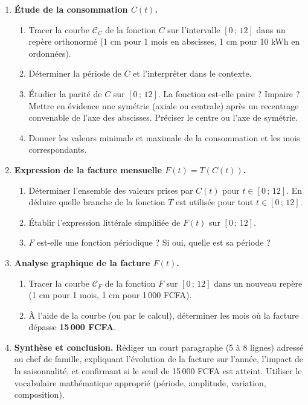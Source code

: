 \documentclass[11pt]{article}
\newcommand{\cle}[1]{{\popxbold\color{popdark}#1}}
\begin{document}
\begin{enumerate}
    \item \textbf{Étude de la consommation $C(t)$.}
    \begin{enumerate}
        \item Tracer la courbe $\mathcal{C}_C$ de la fonction $C$ sur l'intervalle $[0\,;\,12]$ dans un repère orthonormé (1 cm pour 1 mois en abscisses, 1 cm pour 10 kWh en ordonnées).
        \item Déterminer la \cle{période} de $C$ et l'interpréter dans le contexte.
        \item Étudier la \cle{parité} de $C$ sur $[0\,;\,12]$. La fonction est-elle paire ? Impaire ? Mettre en évidence une symétrie (axiale ou centrale) après un recentrage convenable de l'axe des abscisses. Préciser le centre ou l'axe de symétrie.
        \item Donner les valeurs minimale et maximale de la consommation et les mois correspondants.
    \end{enumerate}

    \item \textbf{Expression de la facture mensuelle $F(t) = T(C(t))$.}
    \begin{enumerate}
        \item Déterminer l'ensemble des valeurs prises par $C(t)$ pour $t \in [0\,;\,12]$. En déduire quelle branche de la fonction $T$ est utilisée pour tout $t \in [0\,;\,12]$.
        \item Établir l'expression littérale simplifiée de $F(t)$ sur $[0\,;\,12]$.
        \item $F$ est-elle une fonction périodique ? Si oui, quelle est sa période ?
    \end{enumerate}

    \item \textbf{Analyse graphique de la facture $F(t)$.}
    \begin{enumerate}
        \item Tracer la courbe $\mathcal{C}_F$ de la fonction $F$ sur $[0\,;\,12]$ dans un nouveau repère (1 cm pour 1 mois, 1 cm pour 1\,000 FCFA).
        \item À l'aide de la courbe (ou par le calcul), déterminer les mois où la facture dépasse \textbf{15\,000 FCFA}.
    \end{enumerate}

    \item \textbf{Synthèse et conclusion.}
    Rédiger un court paragraphe (5 à 8 lignes) adressé au chef de famille, expliquant l'évolution de la facture sur l'année, l'impact de la saisonnalité, et confirmant si le seuil de 15\,000 FCFA est atteint. Utiliser le vocabulaire mathématique approprié (période, amplitude, variation, composition).
\end{enumerate}
\end{document}
